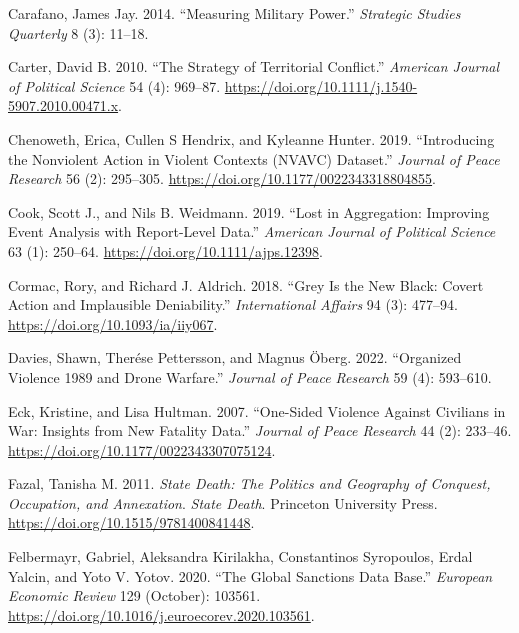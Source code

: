 \documentclass{article}
\newlength{\cslhangindent}
\newlength{\cslentryspacingunit} %
\newenvironment{CSLReferences}[2] %
 {%
  \setlength{\parindent}{0pt}
  \ifodd #1
  \let\oldpar\par
  \def\par{\hangindent=\cslhangindent\oldpar}
  \fi
  \setlength{\parskip}{#2\cslentryspacingunit}
 }%
 {}
\begin{document}
\begin{CSLReferences}{1}{0}
\leavevmode{}%
Carafano, James Jay. 2014. {``Measuring {Military Power}.''}
\emph{Strategic Studies Quarterly} 8 (3): 11--18.

\leavevmode{}%
Carter, David B. 2010. {``The {Strategy} of {Territorial Conflict}.''}
\emph{American Journal of Political Science} 54 (4): 969--87.
\url{https://doi.org/10.1111/j.1540-5907.2010.00471.x}.

\leavevmode{}%
Chenoweth, Erica, Cullen S Hendrix, and Kyleanne Hunter. 2019.
{``Introducing the {Nonviolent Action} in {Violent Contexts} ({NVAVC})
Dataset.''} \emph{Journal of Peace Research} 56 (2): 295--305.
\url{https://doi.org/10.1177/0022343318804855}.

\leavevmode{}%
Cook, Scott J., and Nils B. Weidmann. 2019. {``Lost in {Aggregation}:
{Improving Event Analysis} with {Report-Level Data}.''} \emph{American
Journal of Political Science} 63 (1): 250--64.
\url{https://doi.org/10.1111/ajps.12398}.

\leavevmode{}%
Cormac, Rory, and Richard J. Aldrich. 2018. {``Grey Is the New Black:
Covert Action and Implausible Deniability.''} \emph{International
Affairs} 94 (3): 477--94. \url{https://doi.org/10.1093/ia/iiy067}.

\leavevmode{}%
Davies, Shawn, Therése Pettersson, and Magnus Öberg. 2022. {``Organized
Violence 1989 and Drone Warfare.''} \emph{Journal of
Peace Research} 59 (4): 593--610.

\leavevmode{}%
Eck, Kristine, and Lisa Hultman. 2007. {``One-{Sided Violence Against
Civilians} in {War}: {Insights} from {New Fatality Data}.''}
\emph{Journal of Peace Research} 44 (2): 233--46.
\url{https://doi.org/10.1177/0022343307075124}.

\leavevmode{}%
Fazal, Tanisha M. 2011. \emph{State {Death}: {The Politics} and
{Geography} of {Conquest}, {Occupation}, and {Annexation}}. \emph{State
Death}. {Princeton University Press}.
\url{https://doi.org/10.1515/9781400841448}.

\leavevmode{}%
Felbermayr, Gabriel, Aleksandra Kirilakha, Constantinos Syropoulos,
Erdal Yalcin, and Yoto V. Yotov. 2020. {``The Global Sanctions Data
Base.''} \emph{European Economic Review} 129 (October): 103561.
\url{https://doi.org/10.1016/j.euroecorev.2020.103561}.


\end{CSLReferences}
\end{document}
